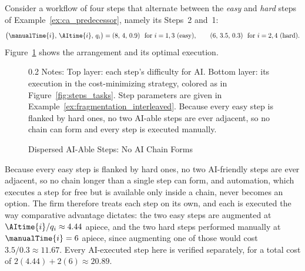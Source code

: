 \begin{example}
\label{ex:fragmentation_interleaved}
Consider a workflow of four steps that alternate between the \emph{easy} and \emph{hard} steps of Example~\ref{ex:ca_predecessor}, namely its Steps~2 and~1:
\[ \bigl(\manualTime{i},\, \AItime{i},\, q_i\bigr) = (8,\,4,\,0.9) \ \text{ for $i = 1, 3$ (easy)}, \qquad (6,\,3.5,\,0.3) \ \text{ for $i = 2, 4$ (hard)}. \]
Figure~\ref{fig:ex_dispersed} shows the arrangement and its optimal execution.
\begin{figure}[!t]
\caption{Dispersed AI-Able Steps: No AI Chain Forms}
\label{fig:ex_dispersed}
\centering

\par\vspace{\fignotesskip}
\begin{minipage}{1\linewidth}
\begin{spacing}{0.2}
{\fontsize{9.5pt}{10pt}\selectfont Notes: Top layer: each step's difficulty for AI. Bottom layer: its execution in the cost-minimizing strategy, colored as in Figure~\ref{fig:steps_tasks}. Step parameters are given in Example~\ref{ex:fragmentation_interleaved}. Because every easy step is flanked by hard ones, no two AI-able steps are ever adjacent, so no chain can form and every step is executed manually.}
\end{spacing}
\end{minipage}
\end{figure}

Because every easy step is flanked by hard ones, no two AI-friendly steps are ever adjacent, so no chain longer than a single step can form, and automation, which executes a step for free but is available only inside a chain, never becomes an option.
The firm therefore treats each step on its own, and each is executed the way comparative advantage dictates: the two easy steps are augmented at $\AItime{i}/q_i \approx 4.44$ apiece, and the two hard steps performed manually at $\manualTime{i} = 6$ apiece, since augmenting one of those would cost $3.5/0.3 \approx 11.67$.
Every AI-executed step here is verified separately, for a total cost of $2(4.44) + 2(6) \approx 20.89$.
\end{example}
